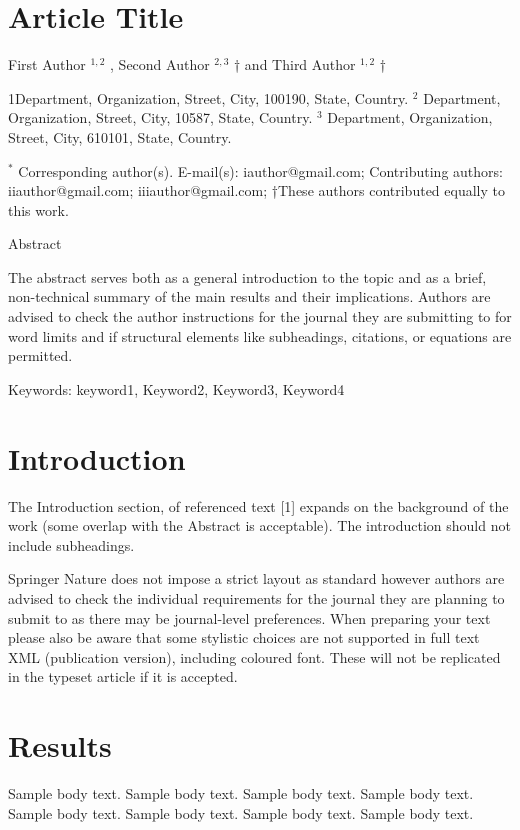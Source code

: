 \section{Article Title}

First Author $^{1,2}$ \*, Second Author $^{2,3}$ † and Third Author $^{1,2}$ †

1\*Department, Organization, Street, City, 100190, State, Country.
$^2$ Department, Organization, Street, City, 10587, State, Country.
$^3$ Department, Organization, Street, City, 610101, State, Country.

$^*$ Corresponding author(s). E-mail(s): iauthor@gmail.com; Contributing authors: iiauthor@gmail.com; iiiauthor@gmail.com; †These authors contributed equally to this work.

Abstract

The abstract serves both as a general introduction to the topic and as a brief, non-technical summary of the main results and their implications. Authors are advised to check the author instructions for the journal they are submitting to for word limits and if structural elements like subheadings, citations, or equations are permitted.

Keywords: keyword1, Keyword2, Keyword3, Keyword4

\section{Introduction}

The Introduction section, of referenced text [1] expands on the background of the work (some overlap with the Abstract is acceptable). The introduction should not include subheadings.

Springer Nature does not impose a strict layout as standard however authors are advised to check the individual requirements for the journal they are planning to submit to as there may be journal-level preferences. When preparing your text please also be aware that some stylistic choices are not supported in full text XML (publication version), including coloured font. These will not be replicated in the typeset article if it is accepted.

\section{Results}

Sample body text. Sample body text. Sample body text. Sample body text.
Sample body text. Sample body text. Sample body text. Sample body text.

